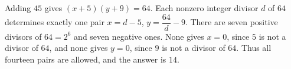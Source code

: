 Adding $45$ gives $(x+5)(y+9)=64$. Each nonzero integer divisor $d$ of $64$ determines exactly one pair $x=d-5$, $y=\dfrac{64}{d}-9$. There are seven positive divisors of $64=2^6$ and seven negative ones. None gives $x=0$, since $5$ is not a divisor of $64$, and none gives $y=0$, since $9$ is not a divisor of $64$. Thus all fourteen pairs are allowed, and the answer is $\boxed{14}$.
